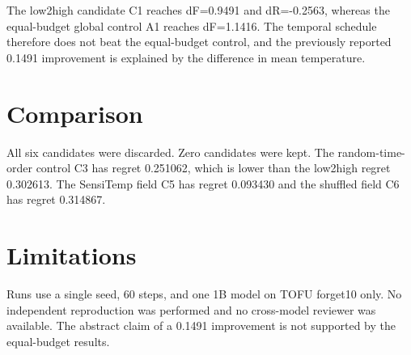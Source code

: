 \documentclass{article}
\begin{document}
The low2high candidate C1 reaches dF=0.9491 and dR=-0.2563, whereas the equal-budget
global control A1 reaches dF=1.1416. The temporal schedule therefore does not beat the
equal-budget control, and the previously reported 0.1491 improvement is explained by the
difference in mean temperature.

\section{Comparison}
All six candidates were discarded. Zero candidates were kept.
The random-time-order control C3 has regret 0.251062, which is lower than the low2high
regret 0.302613. The SensiTemp field C5 has regret 0.093430 and the shuffled field C6
has regret 0.314867.

\section{Limitations}
Runs use a single seed, 60 steps, and one 1B model on TOFU forget10 only.
No independent reproduction was performed and no cross-model reviewer was available.
The abstract claim of a 0.1491 improvement is not supported by the equal-budget results.
\end{document}
